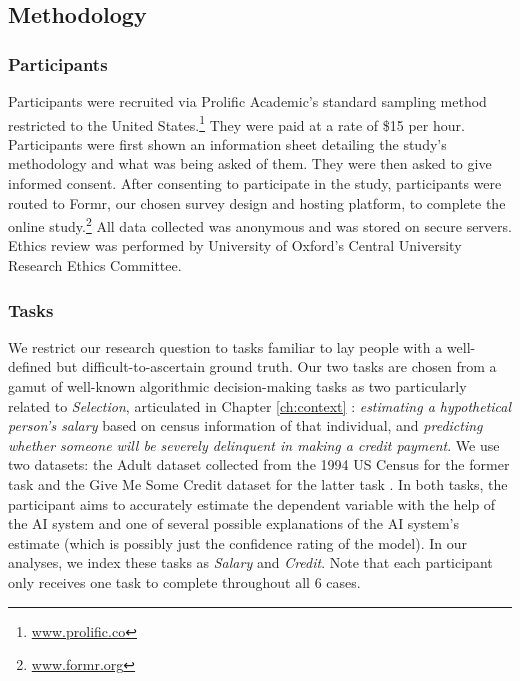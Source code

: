 \subsection{Methodology}
\subsubsection{Participants}
Participants were recruited via Prolific Academic's standard sampling method restricted to the United States.\footnote{\url{www.prolific.co}} They were paid at a rate of \$15 per hour. Participants were first shown an information sheet detailing the study's methodology and what was being asked of them. They were then asked to give informed consent. After consenting to participate in the study, participants were routed to Formr, our chosen survey design and hosting platform, to complete the online study.\footnote{\url{www.formr.org}} All data collected was anonymous and was stored on secure servers. Ethics review was performed by University of Oxford's Central University Research Ethics Committee.

\subsubsection{Tasks}
We restrict our research question to tasks familiar to lay people with a well-defined but difficult-to-ascertain ground truth. Our two tasks are chosen from a gamut of well-known algorithmic decision-making tasks as two particularly related to \emph{Selection}, articulated in Chapter \ref{ch:context} \cite{10.1111/j.1467-954X.2007.00740.x,Pasquale_2006,Latzer_Hollnbuchner_Just_Saurwein_2014}: \emph{estimating a hypothetical person's salary} based on census information of that individual, and \emph{predicting whether someone will be severely delinquent in making a credit payment}. We use two datasets: the Adult dataset collected from the 1994 US Census for the former task and the Give Me Some Credit dataset for the latter task \cite{kohavi_scaling_1996, GiveMeSomeCredit}. In both tasks, the participant aims to accurately estimate the dependent variable with the help of the AI system and one of several possible explanations of the AI system's estimate (which is possibly just the confidence rating of the model). In our analyses, we index these tasks as \emph{Salary} and \emph{Credit}. Note that each participant only receives one task to complete throughout all 6 cases. 

